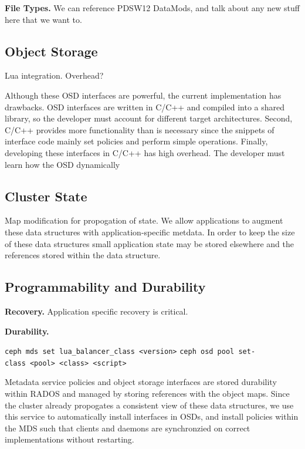 \documentclass[10pt,twocolumn]{article}
\begin{document}
{\bf File Types.}
We can reference PDSW12 DataMods, and talk about any new stuff here that we
want to.

\subsection{Object Storage}

%

Lua integration. Overhead?

Although these OSD interfaces are powerful, the current implementation
has drawbacks. OSD interfaces are written in C/C++ and compiled into a
shared library, so the developer must account for different target
architectures. Second, C/C++ provides more functionality than is
necessary since the snippets of interface code mainly set policies and
perform simple operations. Finally, developing these interfaces in C/C++
has high overhead. The developer must learn how the OSD dynamically

\subsection{Cluster State}

Map modification for propogation of state. We allow applications to augment
these data structures with application-specific metdata. In order to keep the
size of these data structures small application state may be stored elsewhere
and the references stored within the data structure.

\subsection{Programmability and Durability}

{\bf Recovery.}
Application specific recovery is critical.

{\bf Durability.}

\noindent \texttt{ceph\ mds\ set\ lua\_balancer\_class\ \textless{}version\textgreater{}}
\noindent \texttt{ceph\ osd\ pool\ set-class\ \textless{}pool\textgreater{}\ \textless{}class\textgreater{}\ \textless{}script\textgreater{}}

Metadata service policies and object storage interfaces are stored durability
within RADOS and managed by storing references with the object maps. Since
the cluster already propogates a consistent view of these data structures,
we use this service to automatically install interfaces in OSDs, and install
policies within the MDS such that clients and daemons are synchronzied on
correct implementations without restarting.
\end{document}
